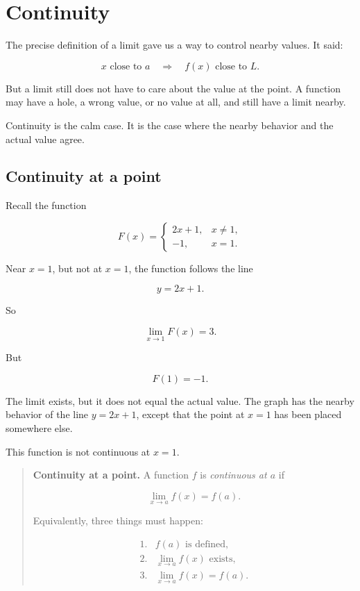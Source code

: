 \section{Continuity}
\label{sec:continuity}

The precise definition of a limit gave us a way to control nearby values.  It said:

\[
x\text{ close to }a
\quad \Longrightarrow \quad
f(x)\text{ close to }L.
\]

But a limit still does not have to care about the value at the point.  A function may have a hole, a wrong value, or no value at all, and still have a limit nearby.

Continuity is the calm case.  It is the case where the nearby behavior and the actual value agree.

\subsection{Continuity at a point}
\label{subsec:continuity-at-point}

Recall the function

\[
F(x)=
\begin{cases}
2x+1, & x\neq1,\\
-1, & x=1.
\end{cases}
\]

Near \(x=1\), but not at \(x=1\), the function follows the line

\[
y=2x+1.
\]

So

\[
\lim_{x\to1}F(x)=3.
\]

But

\[
F(1)=-1.
\]

The limit exists, but it does not equal the actual value.  The graph has the nearby behavior of the line \(y=2x+1\), except that the point at \(x=1\) has been placed somewhere else.

This function is not continuous at \(x=1\).

\begin{quote}
\textbf{Continuity at a point.}
A function \(f\) is \emph{continuous at \(a\)} if

\[
\lim_{x\to a}f(x)=f(a).
\]

Equivalently, three things must happen:

\[
\begin{array}{ll}
1. & f(a)\text{ is defined},\\
2. & \displaystyle \lim_{x\to a}f(x)\text{ exists},\\
3. & \displaystyle \lim_{x\to a}f(x)=f(a).
\end{array}
\]
\end{quote}

